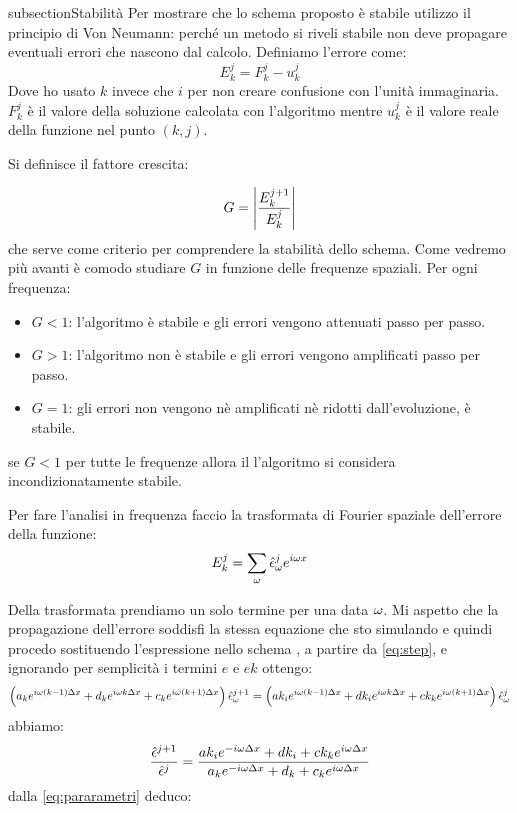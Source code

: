 subsection{Stabilit\`a}
Per mostrare che lo schema proposto \`e stabile utilizzo il principio di Von Neumann:
perch\'e un metodo si riveli stabile non deve propagare eventuali errori che nascono dal calcolo. Definiamo l'errore come:
\begin{equation}
  E_k^j = F_k^j-u_k^j
\end{equation}
Dove ho usato $k$ invece che $i$ per non creare confusione con l'unit\`a immaginaria. $F_k^j$ \`e il valore della soluzione calcolata con l'algoritmo mentre $u_k^j$ \`e il valore reale della funzione nel punto $(k,j)$.

Si definisce il fattore  crescita:

\begin{equation}\label{eq:vonNeumannCrescita}
  G = \lr||{\frac{E^{j+1}_k}{E^j_k}}
\end{equation}
che serve come criterio per comprendere la stabilit\`a dello schema.
Come vedremo pi\`u avanti \`e comodo studiare $G$ in funzione delle frequenze spaziali. Per ogni frequenza:
\begin{itemize}
\item $G<1$:	l'algoritmo \`e  stabile e gli errori vengono attenuati passo per passo.
\item $G>1$:	l'algoritmo non \`e  stabile e gli errori vengono amplificati passo per passo.
\item $G=1$:	gli errori non vengono n\`e amplificati n\`e ridotti dall'evoluzione, \`e stabile.
\end{itemize}
se $G<1$ per tutte le frequenze allora il l'algoritmo si considera incondizionatamente stabile.

Per fare l'analisi in frequenza faccio la trasformata di Fourier spaziale dell'errore della funzione:
\begin{equation}
  E_k^j = \sum_{\o} \hat{\epsilon}^j_\o e^{i\o x}
\end{equation}

Della trasformata prendiamo un solo termine per una data $\o$. Mi aspetto che la propagazione dell'errore soddisfi la stessa equazione che sto simulando e quindi procedo sostituendo l'espressione nello schema ,
a partire da \eqref{eq:step}, e ignorando per semplicit\`a i termini $e$ e $ek$ ottengo:
\begin{equation}
  \lrt{a_{k} e^{i\o (k- 1) \Delta x}+d_k e^{i\o k \Delta x} +c_{k}e^{i\o (k+1) \Delta x}} \hat{\epsilon}^{j+1}_\o= 
  \lrt{ak_i e^{i\o (k-1) \Delta x}+ dk_i e^{i\o k \Delta x} + ck_ke^{i\o (k+1) \Delta x}} \hat{\epsilon}^j_\o
\end{equation}
abbiamo:
\begin{equation}
  \frac{\hat{\epsilon}^{j+1}}{\hat{\epsilon}^j}= 
  \frac{ak_i e^{-i\o \Delta x}+ dk_i+ ck_ke^{i\o \Delta x}}{a_{k} e^{-i\o \Delta x}+d_k  +c_{k}e^{i\o\Delta x}}
\end{equation}
dalla \eqref{eq:pararametri} deduco:

